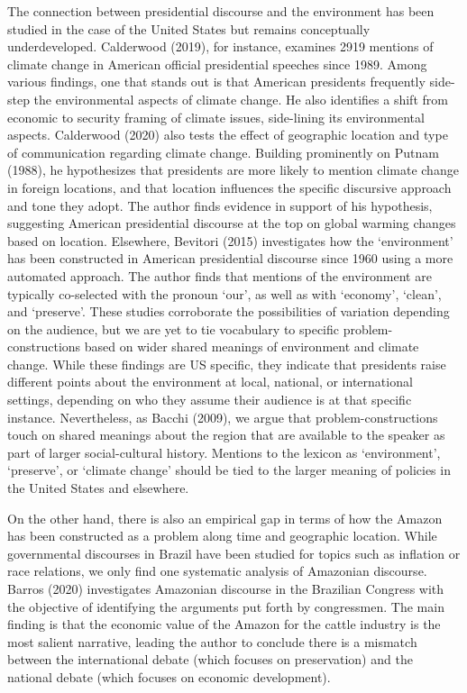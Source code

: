 \documentclass[
]{article}
\begin{document}
The connection between presidential discourse and the environment has
been studied in the case of the United States but remains conceptually
underdeveloped. Calderwood (2019), for instance, examines 2919 mentions
of climate change in American official presidential speeches since 1989.
Among various findings, one that stands out is that American presidents
frequently side-step the environmental aspects of climate change. He
also identifies a shift from economic to security framing of climate
issues, side-lining its environmental aspects. Calderwood (2020) also
tests the effect of geographic location and type of communication
regarding climate change. Building prominently on Putnam (1988), he
hypothesizes that presidents are more likely to mention climate change
in foreign locations, and that location influences the specific
discursive approach and tone they adopt. The author finds evidence in
support of his hypothesis, suggesting American presidential discourse at
the top on global warming changes based on location. Elsewhere, Bevitori
(2015) investigates how the `environment' has been constructed in
American presidential discourse since 1960 using a more automated
approach. The author finds that mentions of the environment are
typically co-selected with the pronoun `our', as well as with `economy',
`clean', and `preserve'. These studies corroborate the possibilities of
variation depending on the audience, but we are yet to tie vocabulary to
specific problem-constructions based on wider shared meanings of
environment and climate change. While these findings are US specific,
they indicate that presidents raise different points about the
environment at local, national, or international settings, depending on
who they assume their audience is at that specific instance.
Nevertheless, as Bacchi (2009), we argue that problem-constructions
touch on shared meanings about the region that are available to the
speaker as part of larger social-cultural history. Mentions to the
lexicon as `environment', `preserve', or `climate change' should be tied
to the larger meaning of policies in the United States and elsewhere.

On the other hand, there is also an empirical gap in terms of how the
Amazon has been constructed as a problem along time and geographic
location. While governmental discourses in Brazil have been studied for
topics such as inflation or race relations, we only find one systematic
analysis of Amazonian discourse. Barros (2020) investigates Amazonian
discourse in the Brazilian Congress with the objective of identifying
the arguments put forth by congressmen. The main finding is that the
economic value of the Amazon for the cattle industry is the most salient
narrative, leading the author to conclude there is a mismatch between
the international debate (which focuses on preservation) and the
national debate (which focuses on economic development).
\end{document}
